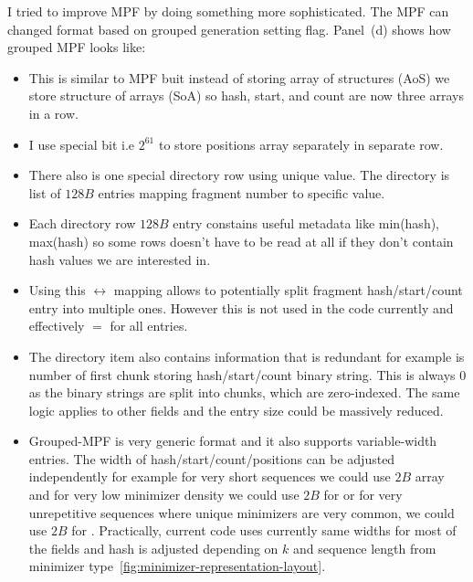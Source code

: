 I tried to improve MPF by doing something more sophisticated. The MPF can changed format based on grouped generation setting flag.
Panel~(d) shows how grouped MPF looks like:
\begin{itemize}
    \item This is similar to MPF buit instead of storing array of structures (AoS) we store structure of arrays (SoA) so hash, start, and count are now three arrays in a row.
    \item I use special bit i.e $2^{61}$ to store positions array separately in separate row.
    \item There also is one special directory row using unique  value. 
    The directory is list of $128B$ entries mapping fragment number to specific  value.
    \item Each directory row $128B$ entry constains useful metadata like min(hash), max(hash) so some rows doesn't have to be read at all if they don't contain 
    hash values we are interested in.
    \item Using this $\leftrightarrow$ mapping allows to potentially split fragment hash/start/count entry into multiple ones. 
    However this is not used in the code currently and effectively  $=$  for all entries.
    \item The directory item also contains information that is redundant for example  is number of first chunk storing hash/start/count binary string.
    This is always $0$ as the binary strings are split into chunks, which are zero-indexed. The same logic applies to other fields and the entry size 
    could be massively reduced.
    \item Grouped-MPF is very generic format and it also supports variable-width entries. The width of hash/start/count/positions can be adjusted independently for example 
    for very short sequences we could use $2B$  array and for very low minimizer density we could use $2B$ for  or 
    for very unrepetitive sequences where unique minimizers are very common, we could use $2B$ for .
    Practically, current code uses currently same widths for most of the fields and hash is adjusted depending on $k$ and
    sequence length from minimizer type~\ref{fig:minimizer-representation-layout}.
\end{itemize}

